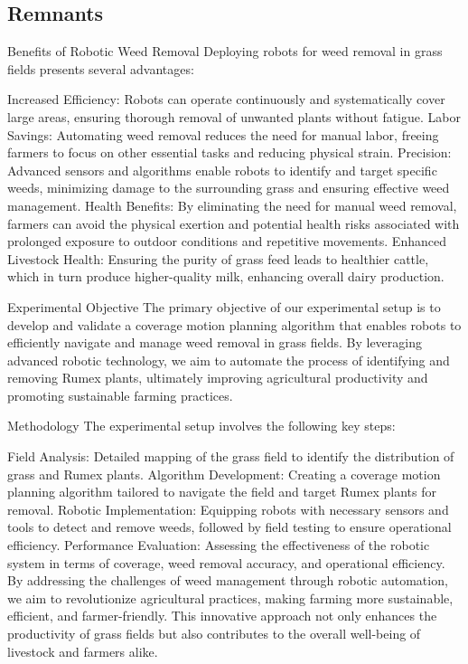 \subsection{Remnants}


Benefits of Robotic Weed Removal
Deploying robots for weed removal in grass fields presents several advantages:

Increased Efficiency: Robots can operate continuously and systematically cover large areas, ensuring thorough removal of unwanted plants without fatigue.
Labor Savings: Automating weed removal reduces the need for manual labor, freeing farmers to focus on other essential tasks and reducing physical strain.
Precision: Advanced sensors and algorithms enable robots to identify and target specific weeds, minimizing damage to the surrounding grass and ensuring effective weed management.
Health Benefits: By eliminating the need for manual weed removal, farmers can avoid the physical exertion and potential health risks associated with prolonged exposure to outdoor conditions and repetitive movements.
Enhanced Livestock Health: Ensuring the purity of grass feed leads to healthier cattle, which in turn produce higher-quality milk, enhancing overall dairy production.


Experimental Objective
The primary objective of our experimental setup is to develop and validate a coverage motion planning algorithm that enables robots to efficiently navigate and manage weed removal in grass fields. By leveraging advanced robotic technology, we aim to automate the process of identifying and removing Rumex plants, ultimately improving agricultural productivity and promoting sustainable farming practices.

Methodology
The experimental setup involves the following key steps:

Field Analysis: Detailed mapping of the grass field to identify the distribution of grass and Rumex plants.
Algorithm Development: Creating a coverage motion planning algorithm tailored to navigate the field and target Rumex plants for removal.
Robotic Implementation: Equipping robots with necessary sensors and tools to detect and remove weeds, followed by field testing to ensure operational efficiency.
Performance Evaluation: Assessing the effectiveness of the robotic system in terms of coverage, weed removal accuracy, and operational efficiency.
By addressing the challenges of weed management through robotic automation, we aim to revolutionize agricultural practices, making farming more sustainable, efficient, and farmer-friendly. This innovative approach not only enhances the productivity of grass fields but also contributes to the overall well-being of livestock and farmers alike.
















